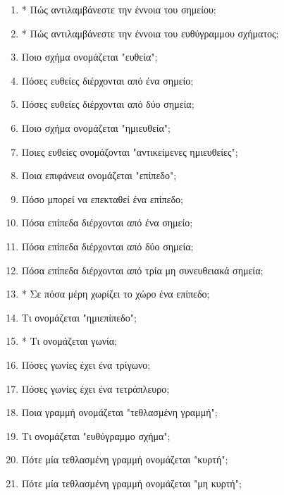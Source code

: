\documentclass[a4paper,11pt]{report}
\begin{document}



\begin{enumerate}
\item * Πώς αντιλαμβάνεστε την έννοια του σημείου;
\item * Πώς αντιλαμβάνεστε την έννοια του ευθύγραμμου σχήματος;
\item Ποιο σχήμα ονομάζεται "ευθεία";
\item Πόσες ευθείες διέρχονται από ένα σημείο;
\item Πόσες ευθείες διέρχονται από δύο σημεία;
\item Ποιο σχήμα ονομάζεται "ημιευθεία"; 
\item Ποιες ευθείες ονομάζονται "αντικείμενες ημιευθείες";
\item Ποια επιφάνεια ονομάζεται "επίπεδο";
\item Πόσο μπορεί να επεκταθεί ένα επίπεδο;
\item Πόσα επίπεδα διέρχονται από ένα σημείο;
\item Πόσα επίπεδα διέρχονται από δύο σημεία; 
\item Πόσα επίπεδα διέρχονται από τρία μη συνευθειακά σημεία;
\item * Σε πόσα μέρη χωρίζει το χώρο ένα επίπεδο;
\item Τι ονομάζεται "ημιεπίπεδο";
\item * Τι ονομάζεται γωνία;
\item Πόσες γωνίες έχει ένα τρίγωνο;
\item Πόσες γωνίες έχει ένα τετράπλευρο;
\item Ποια γραμμή ονομάζεται "τεθλασμένη γραμμή";
\item Τι ονομάζεται "ευθύγραμμο σχήμα";
\item Πότε μία τεθλασμένη γραμμή ονομάζεται "κυρτή";
\item Πότε μία τεθλασμένη γραμμή ονομάζεται "μη κυρτή";

\end{enumerate}
\end{document}
